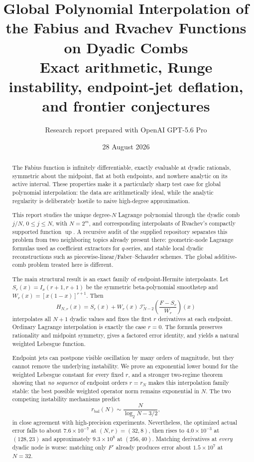 \documentclass[11pt,oneside]{article}
\title{\bfseries Global Polynomial Interpolation of the Fabius and Rvachev Functions on Dyadic Combs\\[4pt]
\large Exact arithmetic, Runge instability, endpoint-jet deflation, and frontier conjectures}
\author{Research report prepared with OpenAI GPT-5.6 Pro}
\date{28 August 2026}
\theoremstyle{definition}
\theoremstyle{remark}
\newcommand{\Up}{\operatorname{up}}
\newcommand{\Lag}{\mathcal I}
\begin{document}
\maketitle

\begin{abstract}
The Fabius function is infinitely differentiable, exactly evaluable at dyadic rationals, symmetric about the midpoint, flat at both endpoints, and nowhere analytic on its active interval.  These properties make it a particularly sharp test case for global polynomial interpolation: the data are arithmetically ideal, while the analytic regularity is deliberately hostile to naive high-degree approximation.

This report studies the unique degree-$N$ Lagrange polynomial through the dyadic comb $j/N$, $0\le j\le N$, with $N=2^m$, and corresponding interpolants of Rvachev's compactly supported function $\Up$.  A recursive audit of the supplied repository separates this problem from two neighboring topics already present there: geometric-node Lagrange formulas used as coefficient extractors for $q$-series, and stable local dyadic reconstructions such as piecewise-linear/Faber--Schauder schemes.  The global additive-comb problem treated here is different.

The main structural result is an exact family of endpoint-Hermite interpolants.  Let $S_r(x)=I_x(r+1,r+1)$ be the symmetric beta-polynomial smoothstep and $W_r(x)=[x(1-x)]^{r+1}$.  Then
\[
 H_{N,r}(x)=S_r(x)+W_r(x)\,\Lag_{N-2}^{\circ}
 \left(\frac{F-S_r}{W_r}\right)(x)
\]
interpolates all $N+1$ dyadic values and fixes the first $r$ derivatives at each endpoint.  Ordinary Lagrange interpolation is exactly the case $r=0$.  The formula preserves rationality and midpoint symmetry, gives a factored error identity, and yields a natural weighted Lebesgue function.

Endpoint jets can postpone visible oscillation by many orders of magnitude, but they cannot remove the underlying instability.  We prove an exponential lower bound for the weighted Lebesgue constant for every fixed $r$, and a stronger two-regime theorem showing that \emph{no sequence} of endpoint orders $r=r_N$ makes this interpolation family stable: the best possible weighted operator norm remains exponential in $N$.  The two competing instability mechanisms predict
\[
 r_{\mathrm{bal}}(N)\sim \frac{N}{\log_2N-3/2},
\]
in close agreement with high-precision experiments.  Nevertheless, the optimized actual error falls to about $7.6\times10^{-7}$ at $(N,r)=(32,8)$, then rises to $4.0\times10^{-3}$ at $(128,23)$ and approximately $9.3\times10^8$ at $(256,40)$.  Matching derivatives at \emph{every} dyadic node is worse: matching only $F'$ already produces error about $1.5\times10^7$ at $N=32$.


\end{abstract}
\end{document}
